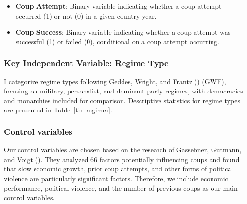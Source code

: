 \documentclass[
  12pt,
]{report}
\begin{document}
\begin{itemize}
\item
  \textbf{Coup Attempt}: Binary variable indicating whether a coup
  attempt occurred (1) or not (0) in a given country-year.
\item
  \textbf{Coup Success}: Binary variable indicating whether a coup
  attempt was successful (1) or failed (0), conditional on a coup
  attempt occurring.
\end{itemize}

\subsubsection{Key Independent Variable: Regime
Type}\label{key-independent-variable-regime-type}

I categorize regime types following Geddes, Wright, and Frantz
() (GWF), focusing on military,
personalist, and dominant-party regimes, with democracies and monarchies
included for comparison. Descriptive statistics for regime types are
presented in Table~\ref{tbl-regimes}.

\subsubsection{Control variables}\label{control-variables}

Our control variables are chosen based on the research of Gassebner,
Gutmann, and Voigt (). They analyzed
66 factors potentially influencing coups and found that slow economic
growth, prior coup attempts, and other forms of political violence are
particularly significant factors. Therefore, we include economic
performance, political violence, and the number of previous coups as our
main control variables.
\end{document}
